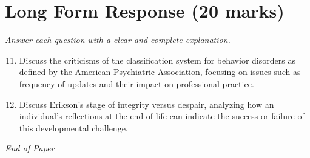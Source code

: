 \documentclass[12pt]{article}
\begin{document}
\section*{Long Form Response (20 marks)}
\textit{Answer each question with a clear and complete explanation.}
\begin{enumerate}[label=\arabic*.]
\setcounter{enumi}{10}
\item Discuss the criticisms of the classification system for behavior disorders as defined by the American Psychiatric Association, focusing on issues such as frequency of updates and their impact on professional practice.
\item Discuss Erikson's stage of integrity versus despair, analyzing how an individual's reflections at the end of life can indicate the success or failure of this developmental challenge.
\end{enumerate}

\vfill
\noindent\textit{End of Paper}
\end{document}
